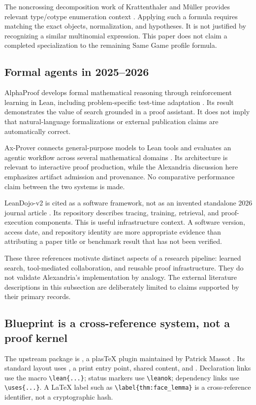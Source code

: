 \documentclass[11pt,reqno]{amsart}
\theoremstyle{definition}
\newcommand{\code}[1]{\texttt{\small\detokenize{#1}}}
\newcommand{\lean}[1]{\par\smallskip\noindent{\footnotesize Lean: \nolinkurl{#1}.}\par\smallskip}
\newcommand{\leanok}{}
\newcommand{\uses}[1]{}
\begin{document}
The noncrossing decomposition work of Krattenthaler and M\"uller provides
relevant type/cotype enumeration context \cite{KrattenthalerMuller2007}.
Applying such a formula requires matching the exact objects, normalization,
and hypotheses. It is not justified by recognizing a similar multinomial
expression. This paper does not claim a completed specialization to the
remaining Same Game profile formula.

\subsection{Formal agents in 2025--2026}
AlphaProof develops formal mathematical reasoning through reinforcement
learning in Lean, including problem-specific test-time adaptation
\cite{Hubert2026AlphaProof}. Its result demonstrates the value of search
grounded in a proof assistant. It does not imply that natural-language
formalizations or external publication claims are automatically correct.

Ax-Prover connects general-purpose models to Lean tools and evaluates an
agentic workflow across several mathematical domains \cite{Breen2026AxProver}.
Its architecture is relevant to interactive proof production, while the
Alexandria discussion here emphasizes artifact admission and provenance.
No comparative performance claim between the two systems is made.

LeanDojo-v2 is cited as a software framework, not as an invented standalone
2026 journal article \cite{LeanDojoV2}. Its repository describes tracing,
training, retrieval, and proof-execution components. This is useful
infrastructure context. A software version, access date, and repository
identity are more appropriate evidence than attributing a paper title or
benchmark result that has not been verified.

These three references motivate distinct aspects of a research pipeline:
learned search, tool-mediated collaboration, and reusable proof infrastructure.
They do not validate Alexandria's implementation by analogy. The external
literature descriptions in this subsection are deliberately limited to
claims supported by their primary records.

\subsection{Blueprint is a cross-reference system, not a proof kernel}
The upstream package is \code{leanblueprint}, a plasTeX plugin maintained by
Patrick Massot \cite{MassotLeanBlueprint}. Its standard layout uses
\code{blueprint/src/web.tex}, a print entry point, shared content, and
\code{plastex.cfg}. Declaration links use the macro \verb|\lean{...}|;
status markers use \verb|\leanok|; dependency links use \verb|\uses{...}|.
A LaTeX label such as \verb|\label{thm:face_lemma}| is a cross-reference
identifier, not a cryptographic hash.
\end{document}
